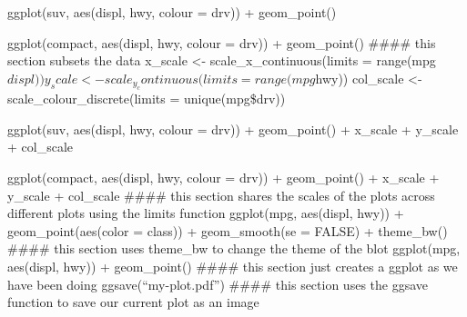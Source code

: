 \documentclass[
]{article}
\begin{document}
ggplot(suv, aes(displ, hwy, colour = drv)) + geom\_point()

ggplot(compact, aes(displ, hwy, colour = drv)) + geom\_point() \#\#\#\#
this section subsets the data x\_scale \textless-
scale\_x\_continuous(limits =
range(mpg\(displ)) y_scale <- scale_y_continuous(limits = range(mpg\)hwy))
col\_scale \textless- scale\_colour\_discrete(limits = unique(mpg\$drv))

ggplot(suv, aes(displ, hwy, colour = drv)) + geom\_point() + x\_scale +
y\_scale + col\_scale

ggplot(compact, aes(displ, hwy, colour = drv)) + geom\_point() +
x\_scale + y\_scale + col\_scale \#\#\#\# this section shares the scales
of the plots across different plots using the limits function
ggplot(mpg, aes(displ, hwy)) + geom\_point(aes(color = class)) +
geom\_smooth(se = FALSE) + theme\_bw() \#\#\#\# this section uses
theme\_bw to change the theme of the blot ggplot(mpg, aes(displ, hwy)) +
geom\_point() \#\#\#\# this section just creates a ggplot as we have
been doing ggsave(``my-plot.pdf'') \#\#\#\# this section uses the ggsave
function to save our current plot as an image
\end{document}

